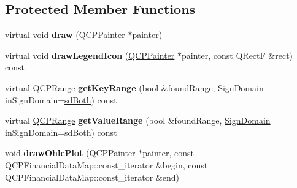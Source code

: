 \subsection*{Protected Member Functions}
\begin{DoxyCompactItemize}
\item 
\mbox{\label{class_q_c_p_financial_ad71a59a1b42616594831e04e52c92120}} 
virtual void {\bfseries draw} (\mbox{\hyperlink{class_q_c_p_painter}{Q\+C\+P\+Painter}} $\ast$painter)
\item 
\mbox{\label{class_q_c_p_financial_a474a3994b081892f1dbdd1162e055b96}} 
virtual void {\bfseries draw\+Legend\+Icon} (\mbox{\hyperlink{class_q_c_p_painter}{Q\+C\+P\+Painter}} $\ast$painter, const Q\+RectF \&rect) const
\item 
\mbox{\label{class_q_c_p_financial_a13da88ffd42ad192a672d54f3f233d15}} 
virtual \mbox{\hyperlink{class_q_c_p_range}{Q\+C\+P\+Range}} {\bfseries get\+Key\+Range} (bool \&found\+Range, \mbox{\hyperlink{class_q_c_p_abstract_plottable_a661743478a1d3c09d28ec2711d7653d8}{Sign\+Domain}} in\+Sign\+Domain=\mbox{\hyperlink{class_q_c_p_abstract_plottable_a661743478a1d3c09d28ec2711d7653d8a082b98cfb91a7363a3b5cd17b0c1cd60}{sd\+Both}}) const
\item 
\mbox{\label{class_q_c_p_financial_a91c698076647d58223f49e7248d1487e}} 
virtual \mbox{\hyperlink{class_q_c_p_range}{Q\+C\+P\+Range}} {\bfseries get\+Value\+Range} (bool \&found\+Range, \mbox{\hyperlink{class_q_c_p_abstract_plottable_a661743478a1d3c09d28ec2711d7653d8}{Sign\+Domain}} in\+Sign\+Domain=\mbox{\hyperlink{class_q_c_p_abstract_plottable_a661743478a1d3c09d28ec2711d7653d8a082b98cfb91a7363a3b5cd17b0c1cd60}{sd\+Both}}) const
\item 
\mbox{\label{class_q_c_p_financial_a3c3007a7434e29d042c77ccf4f497e66}} 
void {\bfseries draw\+Ohlc\+Plot} (\mbox{\hyperlink{class_q_c_p_painter}{Q\+C\+P\+Painter}} $\ast$painter, const Q\+C\+P\+Financial\+Data\+Map\+::const\+\_\+iterator \&begin, const Q\+C\+P\+Financial\+Data\+Map\+::const\+\_\+iterator \&end)
\item 
\mbox{\label{class_q_c_p_financial_a71f5081da0e5ab9c40a488ad40cff122}} 

\end{DoxyCompactItemize}
